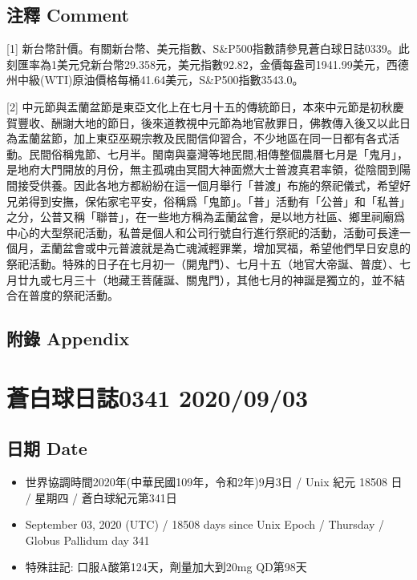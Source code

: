 \documentclass[
]{article}
\providecommand{\tightlist}{%
  \setlength{\itemsep}{0pt}\setlength{\parskip}{0pt}}
\begin{document}
\hypertarget{ux6ce8ux91cb-comment-1}{%
\subsection{注釋 Comment}\label{ux6ce8ux91cb-comment-1}}

{[}1{]}
新台幣計價。有關新台幣、美元指數、S\&P500指數請參見蒼白球日誌0339。此刻匯率為1美元兌新台幣29.358元，美元指數92.82，金價每盎司1941.99美元，西德州中級(WTI)原油價格每桶41.64美元，S\&P500指數3543.0。

{[}2{]}
中元節與盂蘭盆節是東亞文化上在七月十五的傳統節日，本來中元節是初秋慶賀豐收、酬謝大地的節日，後來道教視中元節為地官赦罪日，佛教傳入後又以此日為盂蘭盆節，加上東亞巫覡宗教及民間信仰習合，不少地區在同一日都有各式活動。民間俗稱鬼節、七月半。閩南與臺灣等地民間,相傳整個農曆七月是「鬼月」，是地府大門開放的月份，無主孤魂由冥間大神面燃大士普渡真君率領，從陰間到陽間接受供養。因此各地方都紛紛在這一個月舉行「普渡」布施的祭祀儀式，希望好兄弟得到安撫，保佑家宅平安，俗稱爲「鬼節」。「普」活動有「公普」和「私普」之分，公普又稱「聯普」，在一些地方稱為盂蘭盆會，是以地方社區、鄉里祠廟爲中心的大型祭祀活動，私普是個人和公司行號自行進行祭祀的活動，活動可長達一個月，盂蘭盆會或中元普渡就是為亡魂減輕罪業，增加冥福，希望他們早日安息的祭祀活動。特殊的日子在七月初一（開鬼門）、七月十五（地官大帝誕、普度）、七月廿九或七月三十（地藏王菩薩誕、關鬼門），其他七月的神誕是獨立的，並不結合在普度的祭祀活動。

\hypertarget{ux9644ux9304-appendix-1}{%
\subsection{附錄 Appendix}\label{ux9644ux9304-appendix-1}}

\hypertarget{ux84bcux767dux7403ux65e5ux8a8c0341-20200903}{%
\section{蒼白球日誌0341
2020/09/03}\label{ux84bcux767dux7403ux65e5ux8a8c0341-20200903}}

\hypertarget{ux65e5ux671f-date-2}{%
\subsection{日期 Date}\label{ux65e5ux671f-date-2}}

\begin{itemize}
\tightlist
\item
  世界協調時間2020年(中華民國109年，令和2年)9月3日 / Unix 紀元 18508 日
  / 星期四 / 蒼白球紀元第341日
\item
  September 03, 2020 (UTC) / 18508 days since Unix Epoch / Thursday /
  Globus Pallidum day 341
\item
  特殊註記: 口服A酸第124天，劑量加大到20mg QD第98天
\end{itemize}
\end{document}
